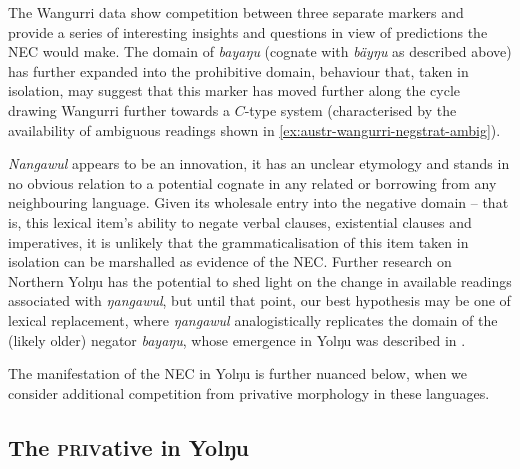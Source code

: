 \documentclass[output=paper,draft,draftmode,colorlinks,citecolor=brown]{langscibook}
\begin{document}
%
The Wangurri data show competition between three separate markers and provide a series of interesting insights and questions in view of predictions the NEC would make. The domain of \textit{bayaŋu} (cognate with \textit{bäyŋu} as described above) has further expanded into the prohibitive domain, behaviour that, taken in isolation, may suggest that this marker has moved further along the cycle drawing Wangurri further towards a $C$-type system (characterised by the availability of ambiguous readings shown in \ref{ex:austr-wangurri-negstrat-ambig}).

\textit{Nangawul} appears to be an innovation, it has an unclear etymology
    and stands in no obvious relation to a potential cognate in any related
    or borrowing from any neighbouring language. Given its wholesale entry
    into the negative domain -- that is, this lexical item's ability to
    negate verbal clauses, existential clauses and imperatives, it is
    unlikely that the grammaticalisation of this item taken in isolation
    can be marshalled as evidence of the NEC. Further research on Northern
    Yolŋu has the potential to shed light on the change in available
    readings associated with \textit{ŋangawul}, but until that point, our
    best hypothesis may be one of lexical replacement, where
    \textit{ŋangawul} analogistically replicates the domain of the (likely
    older) negator \textit{bayaŋu}, whose emergence in Yolŋu was described
    in .

The manifestation of the NEC in Yolŋu is further nuanced below, when we consider additional competition from privative morphology in these languages.

\subsection{The \textsc{priv}ative in Yolŋu}\label{sec:austr-4.4}
\end{document}
